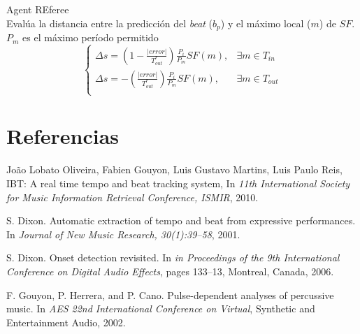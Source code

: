 \documentclass[12pt,a4paper,titlepage]{report}
\begin{document}
\vspace*{-10pt}
Agent REferee\\
Evalúa la distancia entre la predicción del \emph{beat} ($b_p$) y el máximo local ($m$) de $SF$. $P_m$ es el máximo período permitido
$$\begin{cases}
\Delta s = \left(1-\frac{|error|}{T^r_{out}} \right)\frac{P_i}{P_m}SF(m), & \exists m \in T_{in}\\
\Delta s = -\left(\frac{|error|}{T^r_{out}} \right)\frac{P_i}{P_m}SF(m), & \exists m \in T_{out}\\
\end{cases}$$



\section{Referencias}
\begin{thebibliography}{99}
\begin{small}

Jo\~ao Lobato Oliveira, Fabien Gouyon, Luis Gustavo Martins, Luis Paulo Reis, IBT: A real time tempo and beat tracking system, In \emph{11th International Society for Music Information Retrieval Conference, ISMIR}, 2010.

S. Dixon. Automatic extraction of tempo and beat from
expressive performances. In \emph{Journal of New Music Research, 30(1):39–58}, 2001.

S. Dixon. Onset detection revisited. In \emph{in Proceedings of the 9th International Conference on Digital Audio Effects}, pages 133–13, Montreal, Canada, 2006.

F. Gouyon, P. Herrera, and P. Cano. Pulse-dependent analyses of percussive music. In \emph{AES 22nd International Conference on Virtual}, Synthetic and Entertainment Audio, 2002.

\end{small}
\end{thebibliography}
\end{document}
